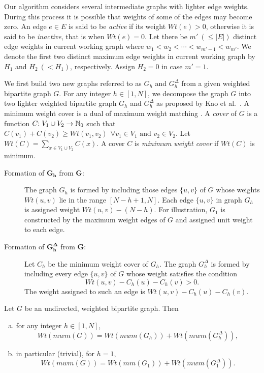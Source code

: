 \documentclass[runningheads,a4paper]{llncs}
\newcommand{\nint}{\mathbb{N}_0}
\newcommand{\cln}{\text{:\;}}
\begin{document}
Our algorithm considers several intermediate graphs with  lighter edge weights. During this process it is possible that weights of some of the
edges may 
become zero. 
An edge $e \in E$ is said to be {\it active} if
its weight $\textit{Wt}(e)>0$, otherwise it is said to be {\it inactive}, that is when $\textit{Wt}(e)=0$. Let there be $m' ~(\leq |E|)$ distinct edge weights in current
working graph where $w_1 < w_2 < \cdots < w_{m' -1} < w_{m'}$.
We denote the first two distinct maximum edge weights in current
working graph by $H_1$ and $H_2 ~(< H_1)$, respectively.
Assign $H_2 = 0$ in case $m' = 1$.

We first build two new graphs referred to as $G_h$ and $G_h^\Delta$ from
a given weighted bipartite graph $G$. For any integer $h \in [1,N]$, we decompose the graph $G$ into two lighter weighted bipartite graph $G_h$ and
$G_h^\Delta$ as proposed by Kao et al.~\cite{kao99,kao02}. A minimum weight cover is a dual of maximum weight matching \cite{kao02}. A \emph{cover}
of $G$ is a function $C \cln V_1 \cup V_2 \rightarrow \nint$ such that
$C(v_1)+C(v_2) \geq \textit{Wt}(v_1,v_2) ~~ \forall v_1 \in V_1 \mbox{ and } v_2 \in V_2$. Let $\textit{Wt}(C)= \sum_{x\in V_1 \cup V_2} C(x)$. A cover $C$ is \emph{minimum weight cover} if $\textit{Wt}(C)$ is minimum.
\begin{description}

\item[Formation of $\boldsymbol{G_h}$ from $\boldsymbol G$:] The graph
$G_h$ is formed by including those edges $\{u,v\}$ of $G$ whose weights
 $\textit{Wt}(u,v)$ lie in the range $[N-h+1, N]$. Each edge $\{u,v\}$ in graph
$G_h$ is assigned weight $\textit{Wt}(u,v)-(N-h)$. For illustration, $G_1$ is
constructed by the maximum weight edges of $G$ and assigned unit weight
to each edge.

\item[Formation of $\boldsymbol{G_h^\Delta}$ from $\boldsymbol G$:] Let
$C_h$ be the minimum weight cover of $G_h$. The graph $G_h^\Delta$ is
formed by including every edge $\{u,v\}$ of $G$ whose weight satisfies the condition 
$$\textit{Wt}(u,v)-C_h(u)-C_h(v) > 0.$$ 
The weight assigned to such an
edge is $\textit{Wt}(u,v)-C_h(u)-C_h(v)$.
\end{description}

\begin{theorem}
\label{DecompositionTh}
Let $G$ be an undirected, weighted bipartite graph.
Then
\begin{enumerate}[(a)]
\item for any integer $h\in[1,N]$, $$\textit{Wt}(\textit{mwm}(G))= \textit{Wt}(\textit{mwm}(G_h))+
\textit{Wt}(\textit{mwm}(G_h^\Delta)),$$
\item in particular (trivial), for $h=1$,
$$\textit{Wt}(\textit{mwm}(G))= \textit{Wt}(\textit{mm}(G_1))+ \textit{Wt}(\textit{mwm}(G_1^\Delta)).$$
\end{enumerate}
\end{theorem}
\end{document}
